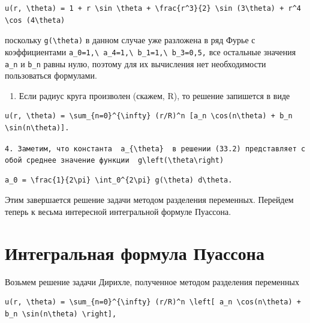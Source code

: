 \documentclass[
  ukrainian,
]{article}
\providecommand{\tightlist}{%
  \setlength{\itemsep}{0pt}\setlength{\parskip}{0pt}}
\begin{document}
\begin{verbatim}
u(r, \theta) = 1 + r \sin \theta + \frac{r^3}{2} \sin (3\theta) + r^4 \cos (4\theta)
\end{verbatim}

поскольку \texttt{g(\textbackslash{}theta)} в данном случае уже
разложена в ряд Фурье с коэффициентами
\texttt{a\_0=1,\textbackslash{}\ a\_4=1,\textbackslash{}\ b\_1=1,\textbackslash{}\ b\_3=0,5,}
все остальные значения \texttt{a\_n} и \texttt{b\_n} равны нулю, поэтому
для их вычисления нет необходимости пользоваться формулами.

\begin{enumerate}
\def\labelenumi{\arabic{enumi}.}
\setcounter{enumi}{2}
\tightlist
\item
  Если радиус круга произволен (скажем, R), то решение запишется в виде
\end{enumerate}

\begin{verbatim}
u(r, \theta) = \sum_{n=0}^{\infty} (r/R)^n [a_n \cos(n\theta) + b_n \sin(n\theta)].
\end{verbatim}

\texttt{4.\ Заметим,\ что\ константа\ \ \textquotesingle{}a\_\{\textbackslash{}theta\}\textquotesingle{}\ \ в\ решении\ (33.2)\ представляет\ собой\ среднее\ значение\ функции\ \ \textquotesingle{}g\textbackslash{}left(\textbackslash{}theta\textbackslash{}right)\textquotesingle{}}

\begin{verbatim}
a_0 = \frac{1}{2\pi} \int_0^{2\pi} g(\theta) d\theta.
\end{verbatim}

Этим завершается решение задачи методом разделения переменных. Перейдем
теперь к весьма интересной интегральной формуле Пуассона.

\section{Интегральная формула
Пуассона}\label{ux438ux43dux442ux435ux433ux440ux430ux43bux44cux43dux430ux44f-ux444ux43eux440ux43cux443ux43bux430-ux43fux443ux430ux441ux441ux43eux43dux430}

Возьмем решение задачи Дирихле, полученное методом разделения переменных

\begin{verbatim}
u(r, \theta) = \sum_{n=0}^{\infty} (r/R)^n \left[ a_n \cos(n\theta) + b_n \sin(n\theta) \right],
\end{verbatim}
\end{document}
